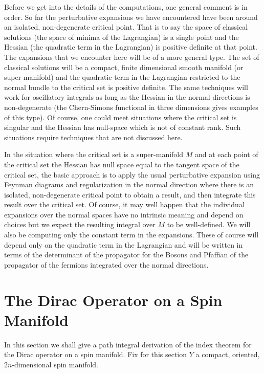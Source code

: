 Before we get into the details of the computations, one general
comment is in order. So far the perturbative expansions we have
encountered have been around an isolated, non-degenerate critical
point.
That is to say the space of classical solutions (the space
of minima of the Lagrangian) is a single point and the Hessian 
(the quadratic term in the Lagrangian) is positive definite at that point.  
The expansions that we encounter here will be of a more general
type. The set of classical solutions  will be a compact, finite dimensional 
smooth manifold (or super-manifold) and the
quadratic term in the Lagrangian restricted to the
normal bundle to the critical set is positive definite.
The same techniques will work for oscillatory integrals as long as the
Hessian  in the normal directions is non-degenerate (the Chern-Simons
functional in three dimensions gives examples of this type).
  Of course, one
could meet situations where the critical set is singular and
the Hessian has null-space which is not of constant rank.  Such
situations require techniques that are not discussed here.

In the situation where the critical set is a super-manifold $M$ and at
each point of the critical set the Hessian has null space equal to the
tangent space of the critical set, the basic approach is to apply the
usual perturbative expansion using Feynman diagrams and regularization
in the normal direction where there is an isolated, non-degenerate
critical point to  
obtain a  result, and then integrate this result over the critical
set. Of course, it may well happen that the individual expansions over
the normal spaces have no intrinsic meaning and depend on choices
but we expect the resulting
integral over $M$ to be well-defined. We will also be computing only
the constant term in the expansions.  These of course will depend only on
the quadratic term in the Lagrangian and will be written in terms of
the determinant of the propagator for the Bosons and
Pfaffian of the
propagator of the fermions integrated over the normal directions.



\section{The Dirac Operator on a Spin Manifold}


In this section we shall give a path integral derivation of the index
theorem for the Dirac operator on a spin manifold. Fix for this
section 
$Y$ a compact, oriented, $2n$-dimensional spin manifold.

